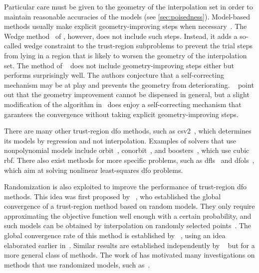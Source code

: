 Particular care must be given to the geometry of the interpolation set in order to maintain reasonable accuracies of the models (see \cref{sec:poisedness}).
Model-based methods usually make explicit geometry-improving steps when necessary~\cite{Conn_Scheinberg_Vicente_2008a,Conn_Scheinberg_Vicente_2008b}.
The Wedge method~\cite{Marazzi_Nocedal_2002} of \citeauthor{Marazzi_Nocedal_2002}, however, does not include such steps.
Instead, it adds a so-called wedge constraint to the trust-region subproblems to prevent the trial steps from lying in a region that is likely to worsen the geometry of the interpolation set.
The method of \citeauthor{Fasano_Morales_Nocedal_2009}~\cite{Fasano_Morales_Nocedal_2009} does not include geometry-improving steps either but performs surprisingly well.
The authors conjecture that a self-correcting mechanism may be at play and prevents the geometry from deteriorating.
\citeauthor{Scheinberg_Toint_2010}~\cite{Scheinberg_Toint_2010} point out that the geometry improvement cannot be dispensed in general, but a slight modification of the algorithm in~\cite{Fasano_Morales_Nocedal_2009} does enjoy a self-correcting mechanism that garantees the convergence without taking explicit geometry-improving steps.

There are many other trust-region \gls{dfo} methods, such as \gls{csv2}~\cite{Billups_Larson_Graf_2013}, which determines its models by regression and not interpolation.
Examples of solvers that use nonpolynomial models include \gls{orbit}~\cite{Wild_Regis_Shoemaker_2008}, \gls{conorbit}~\cite{Regis_Wild_2017}, and \gls{boosters}~\cite{Oeuvray_Bierlaire_2009}, which use cubic \gls{rbf}.
There also exist methods for more specific problems, such as \gls{dfls}~\cite{Zhang_Conn_Scheinberg_2010} and \gls{dfols}~\cite{Cartis_Etal_2019}, which aim at solving nonlinear least-squares \gls{dfo} problems.

Randomization is also exploited to improve the performance of trust-region \gls{dfo} methods.
This idea was first proposed by \citeauthor{Bandeira_Scheinberg_Vicente_2012}~\cite{Bandeira_Scheinberg_Vicente_2012}, who established the global convergence of a trust-region method based on random models.
They only require approximating the objective function well enough with a certain probability, and such models can be obtained by interpolation on randomly selected points~\cite{Bandeira_Scheinberg_Vicente_2014}.
The global convergence rate of this method is established by \citeauthor{Gratton_Etal_2018}~\cite{Gratton_Etal_2018}, using an idea elaborated earlier in~\cite[\S~6]{Gratton_Etal_2015}.
Similar results are established independently by \citeauthor{Cartis_Scheinberg_2018}~\cite{Cartis_Scheinberg_2018} but for a more general class of methods.
The work of \citeauthor{Bandeira_Scheinberg_Vicente_2012} has motivated many investigations on methods that use randomized models, such as~\cite{Chen_Menickelly_Scheinberg_2018}.

